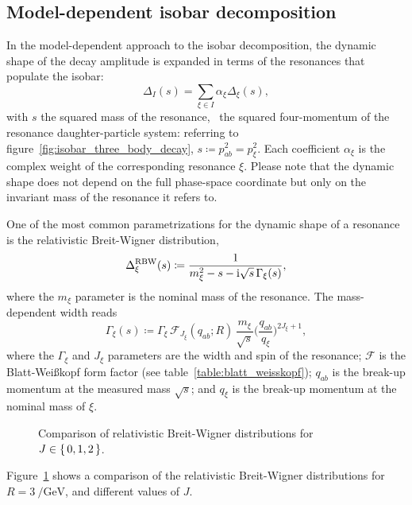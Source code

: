 \subsection{Model-dependent isobar decomposition}


    In the model-dependent approach to the isobar decomposition, the dynamic shape of the decay amplitude is expanded in terms of the resonances that populate the isobar:
    \begin{equation}\label{eq:isobar_mass_shape_expansion}
        \Delta_I(s) = \sum_{\xi\in I} \alpha_{\xi}\Delta_{\xi}(s),
    \end{equation}
    with $s$ the squared mass of the resonance, \ie~the squared four-momentum of the resonance daughter-particle system: referring to figure~\ref{fig:isobar_three_body_decay}, $s\coloneqq p_{ab}^2 = p_{\xi}^2$.
    Each coefficient $\alpha_{\xi}$ is the complex weight of the corresponding resonance $\xi$.
    Please note that the dynamic shape does not depend on the full phase-space coordinate but only on the invariant mass of the resonance it refers to.


    One of the most common parametrizations for the dynamic shape of a resonance is the relativistic Breit-Wigner distribution,
    \begin{equation}\label{eq:rbw}
        \Delta_{\xi}^{\text{RBW}}(s) \coloneqq \frac{1}{m_{\xi}^2 - s - \mathrm{i} \sqrt{s}\, \Gamma_\xi(s)},
    \end{equation}
    where the $m_{\xi}$ parameter is the nominal mass of the resonance.
    The mass-dependent width reads
    \begin{equation}
        \Gamma_\xi(s) \coloneqq \Gamma_{\xi} \, \mathcal{F}_{\!J_\xi}\!(q_{ab};R)\, \frac{m_{\xi}}{\sqrt{s}} \bigg(\frac{q_{ab}}{q_{\xi}}\bigg)^{2J_{\xi}+1},
    \end{equation}
    where the $\Gamma_{\xi}$ and $J_{\xi}$ parameters are the width and spin of the resonance;
    $\mathcal{F}$ is the Blatt-Wei\ss{}kopf form factor (see table~\ref{table:blatt_weisskopf});
    $q_{ab}$ is the break-up momentum at the measured mass $\sqrt{s}$;
    and $q_\xi$ is the break-up momentum at the nominal mass of $\xi$.
    \begin{figure}
        \centering
        
        \caption{Comparison of relativistic Breit-Wigner distributions for $J\in\set{0,1,2}$.}
        \label{fig:comparison_rbws}
    \end{figure}
    Figure~\ref{fig:comparison_rbws} shows a comparison of the relativistic Breit-Wigner distributions for $R = \SI{3}{\per\giga\electronvolt}$, and different values of $J$.



